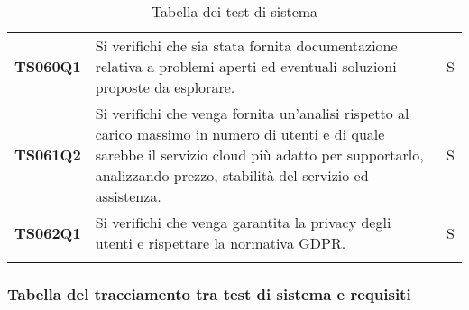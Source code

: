 \documentclass[../../piano-di-qualifica.tex]{subfiles}
\begin{document}
\begin{longtable}[H]{>{\centering\bfseries}m{3cm} >{}m{10cm} >{\centering\arraybackslash}m{3cm}}
  TS060Q1            & Si verifichi che sia stata fornita documentazione relativa a problemi aperti ed eventuali soluzioni proposte da esplorare.
                     & S                                                                                                                                                                                                                                                   \\

  TS061Q2            & Si verifichi che venga fornita un'analisi rispetto al carico massimo in numero di utenti e di quale sarebbe il servizio cloud più adatto per supportarlo, analizzando prezzo, stabilità del servizio ed assistenza.
                     & S                                                                                                                                                                                                                                                  \\

  TS062Q1            & Si verifichi che venga garantita la privacy degli utenti e rispettare la normativa GDPR\@.
                     & S                                                                                                                                                                                                                                                  \\
  \rowcolor{white}
  \caption{Tabella dei test di sistema}%
  \label{tab:test_sistema}
\end{longtable}


\newpage
\subsubsection{Tabella del tracciamento tra test di sistema e requisiti}%
\label{subsub:tabella_tracciamento_test_sistema_requisiti}
\end{document}
